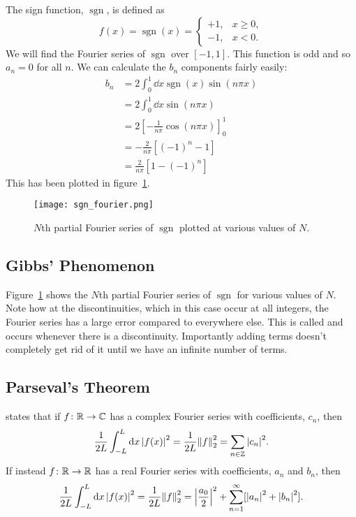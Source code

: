 \documentclass[a4paper]{article}
\DeclareMathOperator{\sgn}{sgn}
\newcommand{\lnorm}[2][]{\norm{#2}_{#1}}
\begin{document}
    \begin{example}
        The sign function, \(\sgn\), is defined as
        \[
            f(x) = \sgn(x) = 
            \begin{cases}
                +1, & x \ge 0,\\
                -1, & x < 0.
            \end{cases}
        \]
        We will find the Fourier series of \(\sgn\) over \([-1, 1]\).
        This function is odd and so \(a_n = 0\) for all \(n\).
        We can calculate the \(b_n\) components fairly easily:
        \begin{align*}
            b_n &= 2 \int_0^1 \dd{x} \sgn(x)\sin(n\pi x)\\
            &= 2 \int_0^1 \dd{x} \sin(n\pi x)\\
            &= 2\left[-\frac{1}{n\pi}\cos(n\pi x)\right]_0^1\\
            &= -\frac{2}{n\pi}[(-1)^n - 1]\\
            &= \frac{2}{n\pi}[1 - (-1)^n]
        \end{align*}
        This has been plotted in figure~\ref{fig:sgn fourier}.
    \end{example}
    \begin{figure}[ht]
        \centering
        \texttt{[image: sgn\_fourier.png]}
        \caption{\(N\)th partial Fourier series of \(\sgn\) plotted at various values of \(N\).}
        \label{fig:sgn fourier}
    \end{figure}
    \subsection{Gibbs' Phenomenon}
    Figure~\ref{fig:sgn fourier} shows the \(N\)th partial Fourier series of \(\sgn\) for various values of \(N\).
    Note how at the discontinuities, which in this case occur at all integers, the Fourier series has a large error compared to everywhere else.
    This is called  and occurs whenever there is a discontinuity.
    Importantly adding terms doesn't completely get rid of it until we have an infinite number of terms.
    
    \subsection{Parseval's Theorem}
     states that if \(f\colon\mathbb{R}\to\mathbb{C}\) has a complex Fourier series with coefficients, \(c_n\), then
    \[\frac{1}{2L}\int_{-L}^{L} \dd{x}\abs{f(x)}^2 = \frac{1}{2L}\lnorm[2]{f}^2 = \sum_{n\in\integers}\abs{c_n}^2.\]
    If instead \(f\colon\mathbb{R}\to\mathbb{R}\) has a real Fourier series with coefficients, \(a_n\) and \(b_n\), then
    \[\frac{1}{2L}\int_{-L}^{L} \dd{x}\abs{f(x)}^2 = \frac{1}{2L}\lnorm[2]{f}^2 = \abs{\frac{a_0}{2}}^2 +  \sum_{n=1}^{\infty}[\abs{a_n}^2 + \abs{b_n}^2].\]
    
\end{document}
